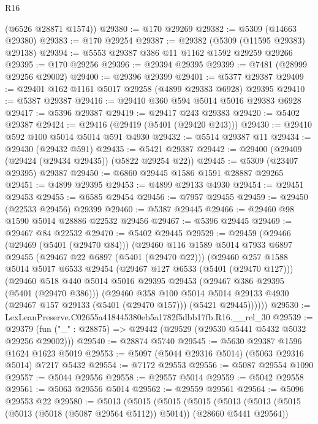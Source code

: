 \begin{lexlean}{R16}
\begin{coremodule}
      (@6526 @28871 @1574))
@29380 := @170 @29269
@29382 := @5309 (@14663 @29380)
@29383 := @170 @29254
@29387 := @29382 (@5309 (@11595 @29383) @29138)
@29394 := @5553 @29387 @386 @11 @1162 @1592 @29259 @29266
@29395 := @170 @29256
@29396 := @29394 @29395
@29399 := @7481 (@28999 @29256 @29002)
@29400 := @29396 @29399
@29401 := @5377 @29387
@29409 := @29401 @162 @1161 @5017 @29258 (@4899 @29383 @6928) @29395
@29410 := @5387 @29387
@29416 := @29410 @360 @594 @5014 @5016 @29383 @6928
@29417 := @5396 @29387
@29419 := @29417 @243 @29383
@29420 := @5402 @29387
@29424 := @29416 (@29419 (@5401 (@29420 @243)))
@29430 := @29410 @592 @100 @5014 @5014 @591 @4930
@29432 := @5514 @29387 @11
@29434 := @29430 (@29432 @591)
@29435 := @5421 @29387
@29442 := @29400 (@29409 (@29424 (@29434 @29435)) (@5822 @29254 @22))
@29445 := @5309 (@23407 @29395) @29387
@29450 := @6860 @29445 @1586 @1591 @28887 @29265
@29451 := @4899 @29395
@29453 := @4899 @29133 @4930
@29454 := @29451 @29453
@29455 := @6585 @29454
@29456 := @7957 @29455
@29459 := @29450 (@22533 @29456) @29399
@29460 := @5387 @29445
@29466 := @29460 @98 @1590 @5014 @28886 @22532 @29456
@29467 := @5396 @29445
@29469 := @29467 @84 @22532
@29470 := @5402 @29445
@29529 := @29459
    (@29466
      (@29469 (@5401 (@29470 @84)))
      (@29460
        @116
        @1589
        @5014
        @7933
        @6897
        @29455
        (@29467 @22 @6897 (@5401 (@29470 @22)))
        (@29460
          @257
          @1588
          @5014
          @5017
          @6533
          @29454
          (@29467 @127 @6533 (@5401 (@29470 @127)))
          (@29460
            @518
            @440
            @5014
            @5016
            @29395
            @29453
            (@29467 @386 @29395 (@5401 (@29470 @386)))
            (@29460
              @358
              @100
              @5014
              @5014
              @29133
              @4930
              (@29467 @157 @29133 (@5401 (@29470 @157)))
              (@5421 @29445))))))
@29530 := LexLeanPreserve.C02655a418445380eb5a1782f5dbb17fb.R16.__rel_30
@29539 := @29379 (fun ("_" : @28875) => @29442 (@29529 (@29530 @5441 @5432 @5032 @29256 @29002)))
@29540 := @28874 @5740
@29545 := @5630 @29387 @1596 @1624 @1623 @5019
@29553 := @5097 (@5044 @29316 @5014) (@5063 @29316 @5014) @7217 @5432
@29554 := @7172 @29553
@29556 := @5087 @29554 @1090
@29557 := @5044 @29556
@29558 := @29557 @5014
@29559 := @5042 @29558
@29561 := @5063 @29556 @5014
@29562 := @29559 @29561
@29564 := @5096 @29553 @22
@29580 := @5013
    (@5015
      (@5015
        (@5015
          (@5013
            (@5013 (@5015 (@5013 (@5018 (@5087 @29564 @5112)) @5014)) (@28660 @5441 @29564))

\end{coremodule}
\end{lexlean}
